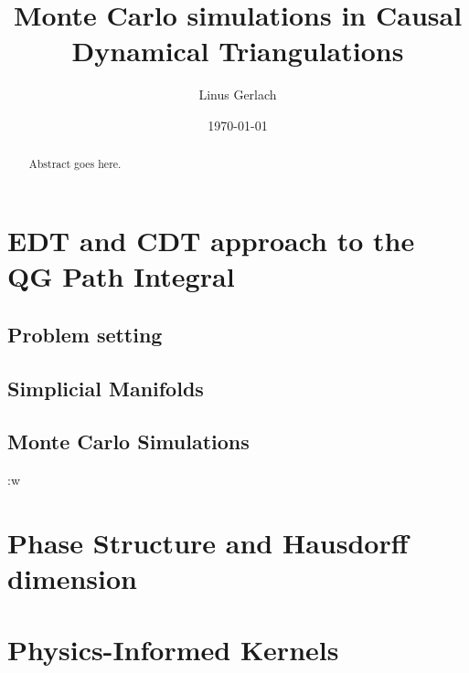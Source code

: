 \documentclass[11pt,a4paper]{article}
\title{Monte Carlo simulations in Causal Dynamical Triangulations}
\author{Linus Gerlach}
\date{\today}
\theoremstyle{definition}
\theoremstyle{remark}
\begin{document}
\maketitle

\begin{abstract}
Abstract goes here.
\end{abstract}


\section{EDT and CDT approach to the QG Path Integral}
\subsection{Problem setting}
\subsection{Simplicial Manifolds}
\subsection{Monte Carlo Simulations}:w



\section{Phase Structure and Hausdorff dimension}

\section{Physics-Informed Kernels}


% 
\end{document}

